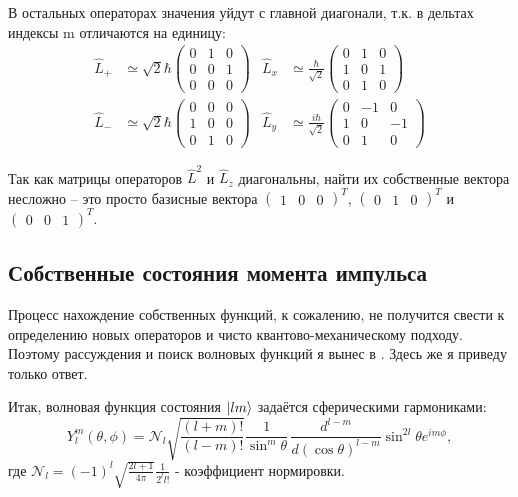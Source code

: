 В остальных операторах значения уйдут с главной диагонали, т.к. в дельтах индексы m отличаются на единицу:
\begin{align*}
    \hat{L}_+ &\simeq \sqrt{2} \hbar \begin{pmatrix}
        0 & 1 & 0 \\ 0 & 0 & 1 \\ 0 & 0 & 0
    \end{pmatrix} &
    \hat{L}_x &\simeq \frac{\hbar}{\sqrt{2}} \begin{pmatrix}
        0 & 1 & 0 \\ 1 & 0 & 1 \\ 0 & 1 & 0
    \end{pmatrix} \\
    \hat{L}_- &\simeq \sqrt{2} \hbar \begin{pmatrix}
        0 & 0 & 0 \\ 1 & 0 & 0 \\ 0 & 1 & 0
    \end{pmatrix} &
    \hat{L}_y &\simeq \frac{i\hbar}{\sqrt{2}} \begin{pmatrix}
        0 & -1 & 0 \\ 1 & 0 & -1 \\ 0 & 1 & 0
    \end{pmatrix}
\end{align*}

Так как матрицы операторов $\hat{L}^2$ и $\hat{L}_z$ диагональны, найти их собственные вектора несложно -- это просто базисные вектора $\begin{pmatrix} 1 & 0 & 0 \end{pmatrix}^T$, $\begin{pmatrix} 0 & 1 & 0 \end{pmatrix}^T$ и $\begin{pmatrix} 0 & 0 & 1 \end{pmatrix}^T$. 

\subsection{Собственные состояния момента импульса}
\hspace{1em} Процесс нахождение собственных функций, к сожалению, не получится свести к определению новых операторов и чисто квантово-механическому подходу. Поэтому рассуждения и поиск волновых функций я вынес в . Здесь же я приведу только ответ.

Итак, волновая функция состояния $\ket{lm}$ задаётся сферическими гармониками:
\[
Y^m_l(\theta, \phi) = \mathcal{N}_l\sqrt{\frac{(l+m)!}{(l-m)!}} \frac{1}{\sin^{m}\theta}\,\frac{d^{l-m}}{d(\cos\theta)^{l-m}}\sin^{2l}\theta e^{im\phi},
\]
где $\mathcal{N}_l = (-1)^l \sqrt{\frac{2l+1}{4\pi}}\frac{1}{2^l l!}$ - коэффициент нормировки.

